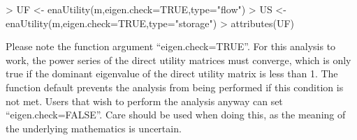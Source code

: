 \documentclass[article]{jss}
\begin{document}
\begin{Schunk}
\begin{Sinput}
> UF <- enaUtility(m,eigen.check=TRUE,type="flow")
> US <- enaUtility(m,eigen.check=TRUE,type="storage")
> attributes(UF)
\end{Sinput}
\end{Schunk}

Please note the function argument ``eigen.check=TRUE''.  For this
analysis to work, the power series of the direct utility matrices must
converge, which is only true if the dominant eigenvalue of the direct
utility matrix is less than 1. The function default prevents the
analysis from being performed if this condition is not met. Users that
wish to perform the analysis anyway can set ``eigen.check=FALSE''.  Care
should be used when doing this, as the meaning of the underlying
mathematics is uncertain.
\end{document}
